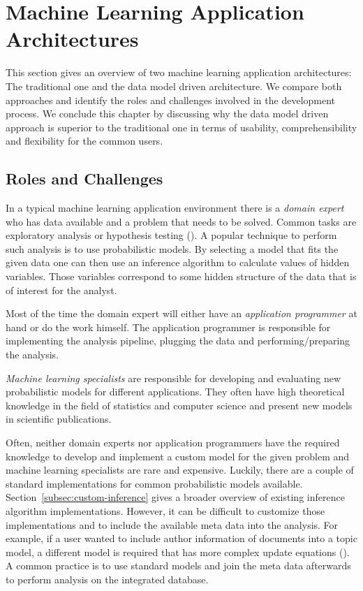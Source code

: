 \section{Machine Learning Application Architectures}

This section gives an overview of two machine learning application architectures: The traditional one and the data model driven architecture. We compare both approaches and identify the roles and challenges involved in the development process. We conclude this chapter by discussing why the data model driven approach is superior to the traditional one in terms of usability, comprehensibility and flexibility for the common users.

\subsection{Roles and Challenges}

In a typical machine learning application environment there is a \emph{domain expert} who has data available and a problem that needs to be solved. Common tasks are exploratory analysis or hypothesis testing (\cite{tukey1980we}). A popular technique to perform such analysis is to use probabilistic models. By selecting a model that fits the given data one can then use an inference algorithm to calculate values of hidden variables. Those variables correspond to some hidden structure of the data that is of interest for the analyst.

Most of the time the domain expert will either have an \emph{application programmer} at hand or do the work himself. The application programmer is responsible for implementing the analysis pipeline, plugging the data and performing/preparing the analysis.

\emph{Machine learning specialists} are responsible for developing and evaluating new probabilistic models for different applications. They often have high theoretical knowledge in the field of statistics and computer science and present new models in scientific publications.

Often, neither domain experts nor application programmers have the required knowledge to develop and implement a custom model for the given problem and machine learning specialists are rare and expensive. Luckily, there are a couple of standard implementations for common probabilistic models available. Section~\ref{subsec:custom-inference} gives a broader overview of existing inference algorithm implementations. However, it can be difficult to customize those implementations and to include the available meta data into the analysis. For example, if a user wanted to include author information of documents into a topic model, a different model is required that has more complex update equations (\cite{rosen2004author}). A common practice is to use standard models and join the meta data afterwards to perform analysis on the integrated database.

